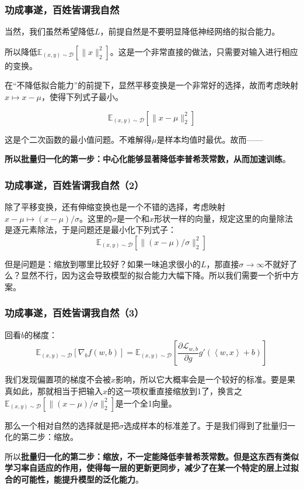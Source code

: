 \documentclass{ctexbeamer}
\begin{document}
\begin{frame}
    \frametitle{功成事遂，百姓皆谓我自然}

    当然，我们虽然希望降低$L$，前提自然是不要明显降低神经网络的拟合能力。

    所以降低$\mathbb{E}_{(x,y) \sim \mathcal{D}}[\|x\|_2^2]$。这是一个非常直接的做法，只需要对输入进行相应的变换。

    在“不降低拟合能力”的前提下，显然平移变换是一个非常好的选择，故而考虑映射$x \mapsto x - \mu$，使得下列式子最小。

    \begin{equation}
\mathbb{E}_{(x,y) \sim \mathcal{D}}[\|x - \mu\|_2^2]
    \end{equation}

    这是个二次函数的最小值问题。不难解得$\mu$是样本均值时最优。故而——

    \textbf{所以批量归一化的第一步：中心化能够显著降低李普希茨常数，从而加速训练}。
    
\end{frame}

\begin{frame}
    \frametitle{功成事遂，百姓皆谓我自然（2）}

    除了平移变换，还有伸缩变换也是一个不错的选择，考虑映射$x-\mu \mapsto (x-\mu) / \sigma$。这里的$\sigma$是一个和$x$形状一样的向量，规定这里的向量除法是逐元素除法，于是问题还是最小化下列式子：
    \begin{equation}
\mathbb{E}_{(x,y) \sim \mathcal{D}}[\|(x - \mu) / \sigma\|_2^2]
\end{equation}
    
    但是问题是：缩放到哪里比较好？如果一味追求很小的$L$，那直接$\sigma \to \infty$不就好了么？显然不行，因为这会导致模型的拟合能力大幅下降。所以我们需要一个折中方案。

\end{frame}

\begin{frame}
    \frametitle{功成事遂，百姓皆谓我自然（3）}
    回看$b$的梯度：
    \begin{equation}
\mathbb{E}_{(x,y) \sim \mathcal{D}}[\nabla_b f(w, b)] = \mathbb{E}_{(x,y) \sim \mathcal{D}}\left[\frac{\partial \mathcal{L}_{w, b}}{\partial g}g'(\left\langle w, x \right\rangle + b)\right]
\end{equation}

    我们发现偏置项的梯度不会被$x$影响，所以它大概率会是一个较好的标准。要是果真如此，那就相当于把输入$x$的这一项权重直接缩放到1了，换言之$\mathbb{E}_{(x,y) \sim \mathcal{D}}[\|(x - \mu) / \sigma\|_2^2]$是一个全1向量。

    那么一个相对自然的选择就是把$\sigma$选成样本的标准差了。于是我们得到了批量归一化的第二步：缩放。

    所以\textbf{批量归一化的第二步：缩放，不一定能降低李普希茨常数。但是这东西有类似学习率自适应的作用，使得每一层的更新更同步，减少了在某一个特定的层上过拟合的可能性，能提升模型的泛化能力}。

\end{frame}
\end{document}

